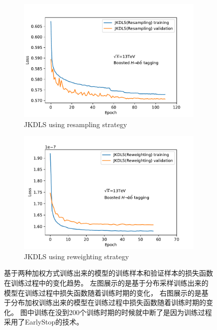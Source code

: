 \begin{figure}[htbp]
  \begin{subfigure}{.5\textwidth}
  \centering
   \includegraphics[width=0.99\textwidth]{figuresXbb/Reweight/LOSSResample.pdf}
   \caption{JKDLS using resampling strategy}
   \label{fig:}
  \end{subfigure}
  \begin{subfigure}{.5\textwidth}
  \centering
   \includegraphics[width=0.99\textwidth]{figuresXbb/Reweight/LOSSReweight.pdf}
   \caption{JKDLS using reweighting strategy}
   \label{fig:}
  \end{subfigure}
  \caption{ 
  基于两种加权方式训练出来的模型的训练样本和验证样本的损失函数在训练过程中的变化趋势。
左图展示的是基于分布采样训练出来的模型在训练过程中损失函数随着训练时期的变化，
右图展示的是基于分布加权训练出来的模型在训练过程中损失函数随着训练时期的变化。
图中训练在没到200个训练时期的时候就中断了是因为训练过程采用了EarlyStop的技术。
   }
  \label{fig:WEILOSS}
\end{figure} 



